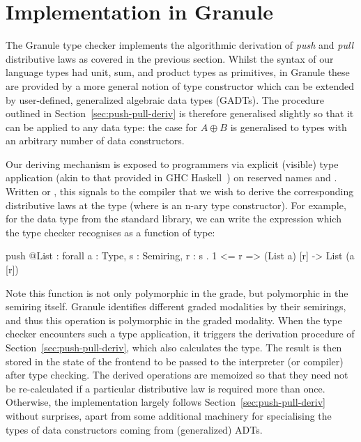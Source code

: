 \section{Implementation in Granule}
\label{sec:implementation-der}
The Granule type checker implements the algorithmic derivation of \emph{push}
 and \emph{pull} distributive laws as covered in the previous section. Whilst the
 syntax of our language types had unit, sum, and product types as primitives, in
 Granule these are provided by a more general notion of type constructor which
 can be extended by user-defined, generalized algebraic data types (GADTs). The
 procedure outlined in Section~\ref{sec:push-pull-deriv} is therefore generalised
 slightly so that it can be applied to any data type: the case for $A \oplus B$
 is generalised to types with an arbitrary number of data constructors.
 
 Our deriving mechanism is exposed to programmers via explicit (visible) type
 application (akin to that provided in GHC Haskell~\citep{eisenberg2016visible})
 on reserved names  and . Written  or
 , this signals to the compiler that we wish to derive the
 corresponding distributive laws at the type  (where  is an
 n-ary type constructor). For example, for the  data
 type from the standard library, we can write the expression 
 which the type checker recognises as a function of type:

\begin{granule}
push @List : forall { a : Type, s : Semiring, r : s } 
           . {1 <= r} => (List a) [r] -> List (a [r])
\end{granule}
 Note this function is not only polymorphic in the grade, but polymorphic in the
 semiring itself. Granule identifies different graded modalities by their
 semirings, and thus this operation is polymorphic in the graded modality. When
 the type checker encounters such a type application, it triggers the derivation
 procedure of Section~\ref{sec:push-pull-deriv}, which also calculates the type. The
 result is then stored in the state of the frontend to be passed to the
 interpreter (or compiler) after type checking. The derived operations are
 memoized so that they need not be re-calculated if a particular distributive
 law is required more than once. Otherwise, the implementation largely follows
 Section~\ref{sec:push-pull-deriv} without surprises, apart from some additional
 machinery for specialising the types of data constructors coming from
 (generalized) ADTs.
 
